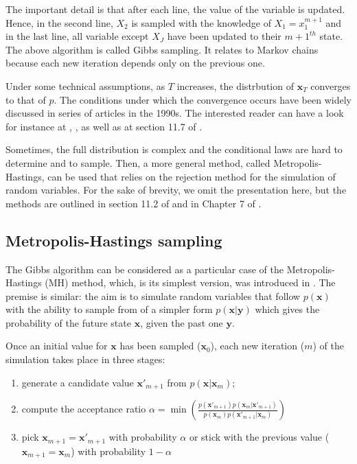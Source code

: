 \documentclass[]{krantz}
\providecommand{\tightlist}{%
  \setlength{\itemsep}{0pt}\setlength{\parskip}{0pt}}
\theoremstyle{definition}
\theoremstyle{definition}
\theoremstyle{definition}
\theoremstyle{remark}
\begin{document}
The important detail is that after each line, the value of the variable
is updated. Hence, in the second line, \(X_2\) is sampled with the
knowledge of \(X_1=x_1^{m+1}\) and in the last line, all variable except
\(X_J\) have been updated to their \(m+1^{th}\) state. The above
algorithm is called Gibbs sampling. It relates to Markov chains because
each new iteration depends only on the previous one.

Under some technical assumptions, as \(T\) increases, the distrbution of
\(\textbf{x}_T\) converges to that of \(p\). The conditions under which
the convergence occurs have been widely discussed in series of articles
in the 1990s. The interested reader can have a look for instance at
\citet{tierney1994markov}, \citet{roberts1994simple}, as well as at
section 11.7 of \citet{gelman2013bayesian}.

Sometimes, the full distribution is complex and the conditional laws are
hard to determine and to sample. Then, a more general method, called
Metropolis-Hastings, can be used that relies on the rejection method for
the simulation of random variables. For the sake of brevity, we omit the
presentation here, but the methods are outlined in section 11.2 of
\citet{gelman2013bayesian} and in Chapter 7 of
\citet{kruschke2014doing}.

\hypertarget{metropolis-hastings-sampling}{%
\subsection{Metropolis-Hastings
sampling}\label{metropolis-hastings-sampling}}

The Gibbs algorithm can be considered as a particular case of the
Metropolis-Hastings (MH) method, which, is its simplest version, was
introduced in \citet{metropolis1949monte}. The premise is similar: the
aim is to simulate random variables that follow \(p(\textbf{x})\) with
the ability to sample from of a simpler form
\(p(\textbf{x}|\textbf{y})\) which gives the probability of the future
state \(\textbf{x}\), given the past one \(\textbf{y}\).

Once an initial value for \(\textbf{x}\) has been sampled
(\(\textbf{x}_0\)), each new iteration (\(m\)) of the simulation takes
place in three stages:

\begin{enumerate}
\def\labelenumi{\arabic{enumi}.}
\tightlist
\item
  generate a candidate value \(\textbf{x}'_{m+1}\) from
  \(p(\textbf{x}|\textbf{x}_m)\);\\
\item
  compute the acceptance ratio
  \(\alpha=\min\left(\frac{p(\textbf{x}'_{m+1})p(\textbf{x}_{m}|\textbf{x}'_{m+1})}{p(\textbf{x}_{m})p(\textbf{x}'_{m+1}|\textbf{x}_{m})} \right)\)
\item
  pick \(\textbf{x}_{m+1}=\textbf{x}'_{m+1}\) with probability
  \(\alpha\) or stick with the previous value
  (\(\textbf{x}_{m+1}=\textbf{x}_{m}\)) with probability \(1-\alpha\)
\end{enumerate}
\end{document}
